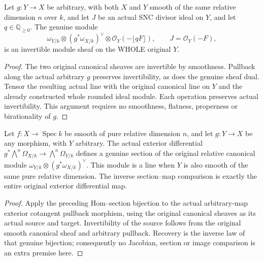 \begin{theorem}
\label{thm:rounded-relative-canonical-original-module}
\leanok
Let $g:Y\to X$ be arbitrary, with both $X$ and $Y$ smooth of the same
relative dimension $n$ over $k$, and let $J$ be an actual SNC divisor ideal
on $Y$, and let $q\in\mathbb Q_{\ge0}$. The genuine module
\[
 \omega_{Y/k}\otimes(g^*\omega_{X/k})^\vee
       \otimes\mathcal O_Y(-\lfloor qF\rfloor),\qquad J=\mathcal O_Y(-F),
\]
is an invertible module sheaf on the WHOLE original $Y$.
\end{theorem}
\begin{proof}
The two original canonical sheaves are invertible by smoothness. Pullback
along the actual arbitrary $g$ preserves invertibility, as does the
genuine sheaf dual. Tensor the resulting actual line with the original
canonical line on $Y$ and the already constructed whole rounded ideal
module. Each operation preserves actual invertibility. This argument
requires no smoothness, flatness, properness or birationality of $g$.
\end{proof}

\begin{theorem}
\label{thm:canonical-original-differential-section}
\leanok
Let $f:X\to\operatorname{Spec}k$ be smooth of pure relative dimension
$n$, and let $g:Y\to X$ be any morphism, with $Y$ arbitrary. The actual
exterior differential
$g^*\bigwedge^n\Omega_{X/k}\to\bigwedge^n\Omega_{Y/k}$ defines a genuine
section of the original relative canonical module
$\omega_{Y/k}\otimes(g^*\omega_{X/k})^\vee$. This module is a line when
$Y$ is also smooth of the same pure relative dimension. The inverse
section--map comparison is exactly the entire original exterior differential map.
\end{theorem}
\begin{proof}
Apply the preceding Hom--section bijection to the actual arbitrary-map
exterior cotangent pullback morphism, using the original canonical sheaves
as its actual source and target. Invertibility of the source follows
from the original smooth canonical sheaf and arbitrary pullback. Recovery
is the inverse law of that genuine bijection; consequently no Jacobian,
section or image comparison is an extra premise here.
\end{proof}
